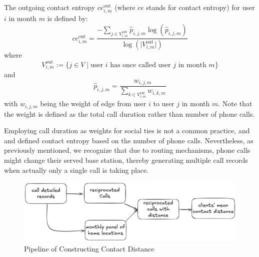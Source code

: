 \begin{definition}
The outgoing contact entropy $ce^{\text{out}}_{i,m}$ (where $ce$ stands for contact entropy) for user $i$ in month $m$ is defined by:
\[
ce^{\text{out}}_{i,m}
=
\frac
{-\sum_{j \in V^{\text{out}}_{i,m}}
\hat{p}_{i,j,m} \log(\hat{p}_{i,j,m})}{\log(\lvert V^\text{out}_{i, m} \rvert )}
\]
where
\begin{equation}\label{eq:outgoing_contacts}
V^{\text{out}}_{i,m}
:=
\{
j \in V
\mid
\text{user } i \text{ has once called user } j \text{ in month } m
\}
\end{equation}
and
\begin{equation}\label{eq:weight_j_for_i_in_month_m}
\hat{p}_{i,j,m}
= \frac{w_{i,j,m}}{\sum_{k \in V^{\text{out}}_{i,m}} w_{i,k,m}}
\end{equation}
with $w_{i,j,m}$ being the weight of edge from user $i$ to user $j$ in month $m$.
Note that the weight is defined as the total call duration rather than number of phone calls.
\end{definition}

Employing call duration as weights for social ties is not a common practice, and \cite{eagle2010network} and \cite{pappalardo2016analytical} defined contact entropy based on the number of phone calls. Nevertheless, as previously mentioned, we recognize that due to routing mechanisms, phone calls might change their served base station, thereby generating multiple call records when actually only a single call is taking place.

\begin{figure}[h!]
\centering
\caption{Pipeline of Constructing Contact Distance}
\vspace{0.1cm}

\includegraphics[scale=0.091]{figures/pipeline_mean_contact_distance.png}


\label{fig:pipeline_contact_distance}
\end{figure}

